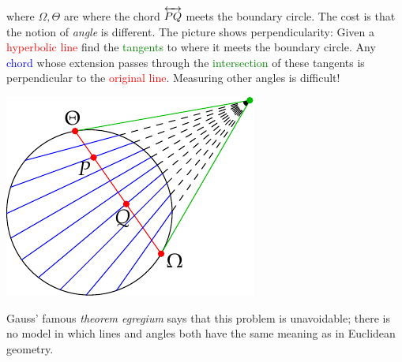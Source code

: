 \begin{minipage}[t]{0.69\linewidth}\vspace{0pt}
	where $\Omega,\Theta$ are where the chord $\smash[t]{\overleftrightarrow{PQ}}$ meets the boundary circle.\smallbreak
	The cost is that the notion of \emph{angle} is different. The picture shows perpendicularity: Given a \textcolor{red}{hyperbolic line} find the \textcolor{Green}{tangents} to where it meets the boundary circle. Any \textcolor{blue}{chord} whose extension passes through the \textcolor{Green}{intersection} of these tangents is perpendicular to the \textcolor{red}{original line}. Measuring other angles is difficult!
\end{minipage}
\hfill
\begin{minipage}[t]{0.3\linewidth}\vspace{-32pt}
	\flushright\includegraphics[scale=0.9]{models-klein}
\end{minipage}\medbreak

Gauss' famous \emph{theorem egregium} says that this problem is unavoidable; there is no model in which lines and angles both have the same meaning as in Euclidean geometry. 


